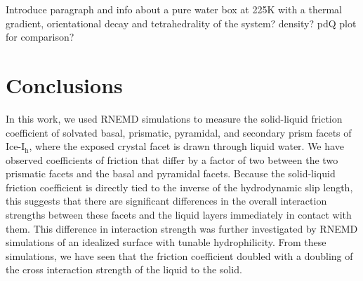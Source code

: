 \documentclass[aps,jcp,preprint,showpacs,superscriptaddress,groupedaddress]{revtex4}  %
\begin{document}





Introduce paragraph and info about a pure water box at 225K with a thermal 
gradient, orientational decay and tetrahedrality of the system? density?
pdQ plot for comparison?

\section{Conclusions}
In this work, we used RNEMD simulations to measure the solid-liquid
friction coefficient of solvated basal, prismatic, pyramidal, and
secondary prism facets of Ice-I$_\mathrm{h}$, where the exposed crystal facet
is drawn through liquid water. We
have observed coefficients of friction that differ by a factor of two
between the two prismatic facets and the basal and pyramidal facets.
Because the solid-liquid friction coefficient is directly tied to the
inverse of the hydrodynamic slip length, this suggests that there are
significant differences in the overall interaction strengths between
these facets and the liquid layers immediately in contact with them.
This difference in interaction strength was further investigated by
RNEMD simulations of an idealized surface with tunable hydrophilicity.
From these simulations, we have seen that the friction coefficient 
doubled with a doubling of the cross interaction strength of the liquid
to the solid.
\end{document}
